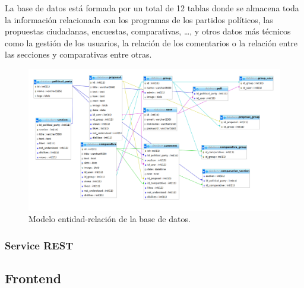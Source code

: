 La base de datos está formada por un total de 12 tablas donde se almacena toda la información relacionada con los programas de los partidos políticos, las propuestas ciudadanas, encuestas, comparativas, …, y otros datos más técnicos como la gestión de los usuarios, la relación de los comentarios o la relación entre las secciones y comparativas entre otras.

	\begin{figure}[H]
      \centering
	\includegraphics[keepaspectratio, scale=0.30]{Media/Captures/database.png}
      \caption{Modelo entidad-relación de la base de datos.}
      \label{fig:brainstorming}
    \end{figure}
  
  
		\subsubsection{Service REST}\label{sssec:rest}

  \subsection{Frontend}
